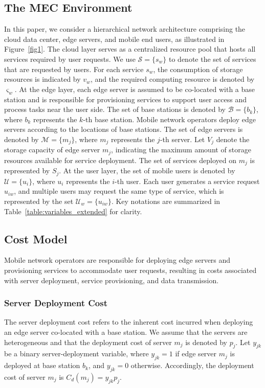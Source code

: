 \documentclass[10pt, conference, letterpaper]{IEEEtran}
\begin{document}
\subsection{The MEC Environment}
In this paper, we consider a hierarchical network architecture comprising the cloud data center, edge servers, and mobile end users, as illustrated in Figure~\ref{fig1}. The cloud layer serves as a centralized resource pool that hosts all services required by user requests. We use $\mathcal{S} = \{s_w\}$ to denote the set of services that are requested by users. For each service $s_w$, the consumption of storage resources is indicated by $v_{w}$, and the required computing resource is denoted by $\varsigma_{w}$. At the edge layer, each edge server is assumed to be co-located with a base station and is responsible for provisioning services to support user access and process tasks near the user side. The set of base stations is denoted by $\mathcal{B} = \{b_k\}$, where $b_k$ represents the $k$-th base station. Mobile network operators deploy edge servers according to the locations of base stations. The set of edge servers is denoted by $\mathcal{M} = \{m_j\}$, where $m_j$ represents the $j$-th server. Let $V_j$ denote the storage capacity of edge server $m_j$, indicating the maximum amount of storage resources available for service deployment. The set of services deployed on $m_j$ is represented by $S_j$. At the user layer, the set of mobile users is denoted by $\mathcal{U} = \{u_i\}$, where $u_i$ represents the $i$-th user. Each user generates a service request $u_{iw}$, and multiple users may request the same type of service, which is represented by the set $\mathcal{U}_{w}=\{u_{iw}\}$. Key notations are summarized in Table~\ref{table:variables_extended} for clarity. 

\subsection{Cost Model}
Mobile network operators are responsible for deploying edge servers and provisioning services to accommodate user requests, resulting in costs associated with server deployment, service provisioning, and data transmission. 
\subsubsection{Server Deployment Cost} 

The server deployment cost refers to the inherent cost incurred when deploying an edge server co-located with a base station. We assume that the servers are heterogeneous and that the deployment cost of server $m_j$ is denoted by $p_j$. Let $y_{jk}$ be a binary server-deployment variable, where $y_{jk}=1$ if edge server $m_j$ is deployed at base station $b_k$, and $y_{jk}=0$ otherwise. Accordingly, the deployment cost of server $m_j$ is $C_{d}(m_j)=y_{jk}p_j$.
\end{document}
